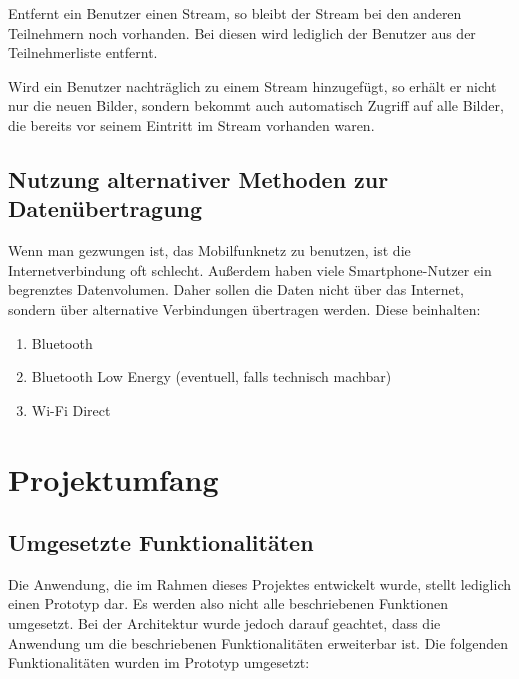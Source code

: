 Entfernt ein Benutzer einen Stream, so bleibt der Stream bei den anderen Teilnehmern noch vorhanden. Bei diesen wird lediglich der Benutzer aus der Teilnehmerliste entfernt.

Wird ein Benutzer nachträglich zu einem Stream hinzugefügt, so erhält er nicht nur die neuen Bilder, sondern bekommt auch automatisch Zugriff auf alle Bilder, die bereits vor seinem Eintritt im Stream vorhanden waren.

\subsection{Nutzung alternativer Methoden zur Datenübertragung}
Wenn man gezwungen ist, das Mobilfunknetz zu benutzen, ist die Internetverbindung oft schlecht. Außerdem haben viele Smartphone-Nutzer ein begrenztes Datenvolumen. Daher sollen die Daten nicht über das Internet, sondern über alternative Verbindungen übertragen werden. Diese beinhalten:

\begin{enumerate}
	\item Bluetooth
	\item Bluetooth Low Energy (eventuell, falls technisch machbar)
	\item Wi-Fi Direct
\end{enumerate}

\section{Projektumfang}

\subsection{Umgesetzte Funktionalitäten}

Die Anwendung, die im Rahmen dieses Projektes entwickelt wurde, stellt lediglich einen Prototyp dar. Es werden also nicht alle beschriebenen Funktionen umgesetzt. Bei der Architektur wurde jedoch darauf geachtet, dass die Anwendung um die beschriebenen Funktionalitäten erweiterbar ist. Die folgenden Funktionalitäten wurden im Prototyp umgesetzt:


